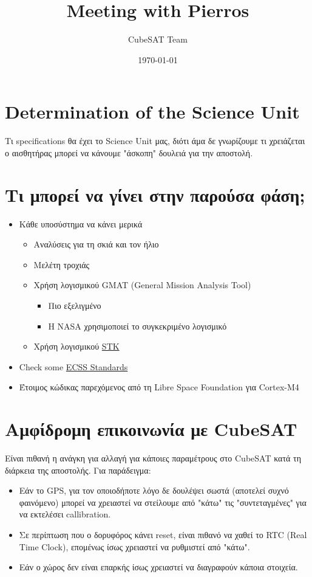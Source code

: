 \documentclass[a4paper,notitlepage]{article}
\title{Meeting with Pierros}
\author{CubeSAT Team}
\date{\today}
\begin{document}
	\maketitle
	
	\section{Determination of the Science Unit}
	Τι specifications θα έχει το Science Unit μας, διότι άμα δε γνωρίζουμε τι χρειάζεται ο αισθητήρας μπορεί να κάνουμε "άσκοπη" δουλειά για την αποστολή.	
	
	\section{Τι μπορεί να γίνει στην παρούσα φάση;}
	\begin{itemize}
		
		\item Κάθε υποσύστημα να κάνει μερικά 
		\begin{itemize}
		\item Αναλύσεις για τη σκιά και τον ήλιο 
		\item Μελέτη τροχιάς
		\item Χρήση λογισμικού GMAT (General Mission Analysis Tool)
		\begin{itemize}
		\item Πιο εξελιγμένο
		\item Η NASA χρησιμοποιεί το συγκεκριμένο λογισμικό
	\end{itemize}
		\item Χρήση λογισμικού \href{https://www.agi.com/products/engineering-tools}{STK} 
	\end{itemize}
		\item Check some 
		\href{http://ecss.nl/standard/ecss-e-st-70-41c-space-engineering-telemetry-and-telecommand-packet-utilization-15-april-2016/}{ECSS Standards}
		\item Έτοιμος κώδικας παρεχόμενος από τη Libre Space Foundation για Cortex-M4

	\end{itemize}

	\section{Αμφίδρομη επικοινωνία με CubeSAT}
	Είναι πιθανή η ανάγκη για αλλαγή για κάποιες παραμέτρους στο CubeSAT κατά τη διάρκεια της αποστολής. Για παράδειγμα:
	\begin{itemize}
		\item Εάν το GPS, για τον οποιοδήποτε λόγο δε δουλέψει σωστά (αποτελεί συχνό φαινόμενο) μπορεί να χρειαστεί να στείλουμε από "κάτω" τις "συντεταγμένες" για να εκτελέσει callibration.
		\item Σε περίπτωση που ο δορυφόρος κάνει reset, είναι πιθανό να χαθεί το RTC (Real Time Clock), επομένως ίσως χρειαστεί να ρυθμιστεί από "κάτω".
		\item Εάν ο χώρος δεν είναι επαρκής ίσως χρειαστεί να διαγραφούν κάποια στοιχεία.
	\end{itemize}
	\newpage
\end{document}
